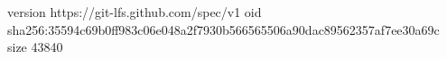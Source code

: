 version https://git-lfs.github.com/spec/v1
oid sha256:35594c69b0ff983c06e048a2f7930b566565506a90dac89562357af7ee30a69c
size 43840
